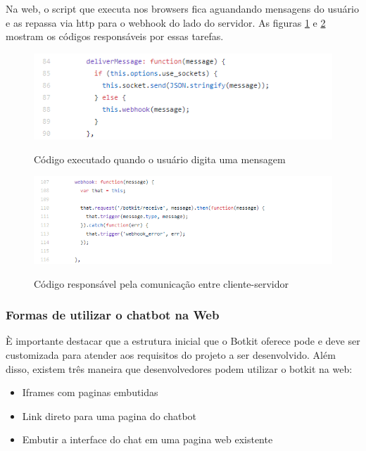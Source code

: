 Na web, o script que executa nos browsers fica aguandando mensagens do usuário e as repassa via http para o webhook do lado do servidor. As figuras \ref{fig:webhook_deliver} e \ref{fig:webhook_code} mostram os códigos responsáveis por essas tarefas. 

\begin{figure}[H]
  \centering
   \caption{Código executado quando o usuário digita uma mensagem}
  \includegraphics[scale=0.8]{Imagens/deliver_webhook.png} 
  \label{fig:webhook_deliver}
\end{figure}


\begin{figure}[H]
  \centering
   \caption{Código responsável pela comunicação entre cliente-servidor}
  \includegraphics[scale=0.8]{Imagens/webhook_code.png} 
  \label{fig:webhook_code}
\end{figure}


\subsubsection{Formas de utilizar o chatbot na Web}

È importante destacar que a estrutura inicial que o Botkit oferece pode e deve ser customizada para atender aos requisitos do projeto a ser desenvolvido. Além disso, existem três maneira que desenvolvedores podem utilizar o botkit na web:

\begin{itemize}
    \item Iframes com paginas embutidas
    \item Link direto para uma pagina do chatbot
    \item Embutir a interface do chat em uma pagina web existente
\end{itemize}



